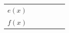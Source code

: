 {{\begin{center}
\begin{tabular}[t]{|l|l|l|l|l|l|}
                  $e\left(x\right)$
                 &
         &
         &
         &
         &
     \tabularnewline\cline{1-1}\cline{2-2}\cline{3-3}\cline{4-4}\cline{5-5}\cline{6-6}
                  $f\left(x\right)$
                 &
         &
         &
         &
         &
     \tabularnewline\cline{1-1}\cline{2-2}\cline{3-3}\cline{4-4}\cline{5-5}\cline{6-6}

\end{tabular}
\end{center}}}
